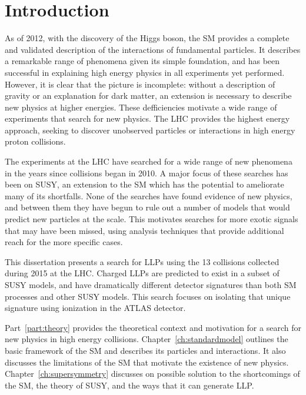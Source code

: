 \chapter{Introduction}

\label{ch:introduction}

As of 2012, with the discovery of the Higgs boson, the \ac{SM} provides a complete and validated description of the interactions of fundamental particles.
It describes a remarkable range of phenomena given its simple foundation, and has been successful in explaining high energy physics in all experiments yet performed.
However, it is clear that the picture is incomplete: without a description of gravity or an explanation for dark matter, an extension is necessary to describe new physics at higher energies.
These defficiencies motivate a wide range of experiments that search for new physics.
The \ac{LHC} provides the highest energy approach, seeking to discover unobserved particles or interactions in high energy proton collisions.

The experiments at the \ac{LHC} have searched for a wide range of new phenomena in the years since collisions began in 2010.
A major focus of these searches has been on \ac{SUSY}, an extension to the \ac{SM} which has the potential to ameliorate many of its shortfalls.
None of the searches have found evidence of new physics, and between them they have begun to rule out a number of models that would predict new particles at the \TeV scale.
This motivates searches for more exotic signals that may have been missed, using analysis techniques that provide additional reach for the more specific cases.

This dissertation presents a search for \acp{LLP} using the 13 \TeV collisions collected during 2015 at the \ac{LHC}.
Charged \acp{LLP} are predicted to exist in a subset of \ac{SUSY} models, and have dramatically different detector signatures than both \ac{SM} processes and other \ac{SUSY} models.
This search focuses on isolating that unique signature using ionization in the ATLAS detector. 

Part~\ref{part:theory} provides the theoretical context and motivation for a search for new physics in high energy collisions.
Chapter~\ref{ch:standardmodel} outlines the basic framework of the \ac{SM} and describes its particles and interactions.
It also discusses the limitations of the \ac{SM} that motivate the existence of new physics.
Chapter~\ref{ch:supersymmetry} discusses on possible solution to the shortcomings of the \ac{SM}, the theory of \acl{SUSY}, and the ways that it can generate \ac{LLP}.

